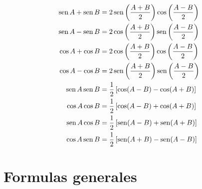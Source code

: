 \begin{align*}
\operatorname{sen} A + \operatorname{sen} B &= 2\operatorname{sen}\left( \frac{A+B}{2} \right)\cos\left( \frac{A-B}{2}\right)\\
\operatorname{sen} A - \operatorname{sen} B &= 2\cos\left( \frac{A+B}{2} \right)\operatorname{sen}\left( \frac{A-B}{2}\right)\\
\cos A + \cos B &= 2\cos\left( \frac{A+B}{2} \right)\cos\left( \frac{A-B}{2}\right)\\
\cos A - \cos B &= 2\operatorname{sen}\left( \frac{A+B}{2} \right)\operatorname{sen}\left( \frac{A-B}{2}\right)\\
\operatorname{sen} A \operatorname{sen} B &= \frac{1}{2}\left[ \cos (A-B)-\cos (A+B) \right]\\
\cos A \cos B &= \frac{1}{2}\left[ \cos (A-B)+\cos (A+B) \right]\\
\operatorname{sen} A \cos B &= \frac{1}{2}\left[ \operatorname{sen} (A-B)+\operatorname{sen} (A+B) \right]\\
\cos A \operatorname{sen} B &= \frac{1}{2}\left[ \operatorname{sen} (A+B)-\operatorname{sen} (A-B) \right]
\end{align*}

\section*{Formulas generales}


